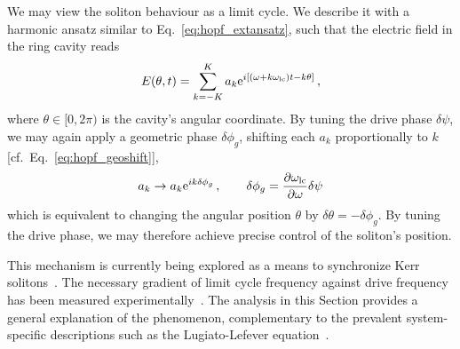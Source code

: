 We may view the soliton behaviour as a limit cycle. We describe it with a harmonic ansatz similar to Eq.~\eqref{eq:hopf_extansatz}, such that the electric field in the ring cavity reads
\begin{equation}
E(\theta, t) = \sum_{k = -K}^{K} a_k {\rm e}^{i \left[\left(\omega + k \omega_{\rm lc} \right)t - k \theta \right]} \,,
\end{equation}
where $\theta \in [0, 2\pi)$ is the cavity's angular coordinate. By tuning the drive phase $\delta \psi$, we may again apply a geometric phase $\delta \phi_g$, shifting each $a_k$ proportionally to $k$ [cf.~Eq.~\eqref{eq:hopf_geoshift}], 
\begin{equation}
a_k \rightarrow a_k {\rm e}^{i k \delta{\phi}_g} \,, \qquad \delta \phi_g = \frac{\partial \omega_{\rm lc}}{\partial \omega} \delta \psi
\end{equation}
which is equivalent to changing the angular position $\theta$ by $\delta \theta = -\delta \phi_g$. By tuning the drive phase, we may therefore achieve precise control of the soliton's position. 

This mechanism is currently being explored as a means to synchronize Kerr solitons~\cite{Jang_2015, Erkintalo_2022}. The necessary gradient of limit cycle frequency against drive frequency has been measured experimentally~\cite{Bao_2017}. The analysis in this Section provides a general explanation of the phenomenon, complementary to the prevalent system-specific descriptions such as the Lugiato-Lefever equation~\cite{Lugiato_1987}. 